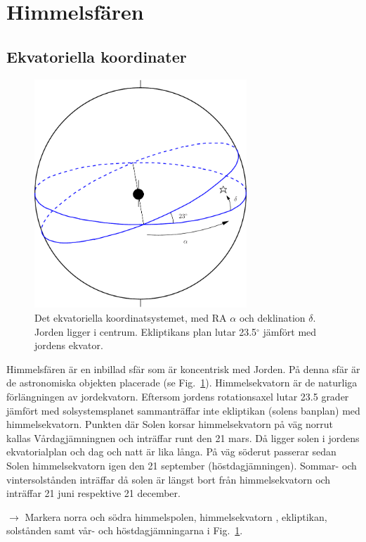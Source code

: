 \section{Himmelsfären}

\subsection{Ekvatoriella koordinater}

\begin{figure}[ht]
\begin{center}
\includegraphics[width=8cm]{../figures/celestial.pdf}
\end{center}
\caption{Det ekvatoriella koordinatsystemet, med RA $\alpha$ och
  deklination $\delta$. Jorden ligger i centrum. Ekliptikans plan
  lutar 23.5$^\circ$ jämfört med jordens ekvator.}
\label{figcelest}
\end{figure}

Himmelsfären är en inbillad sfär som är koncentrisk med Jorden. På
denna sfär är de astronomiska objekten placerade (se
Fig.~\ref{figcelest}). Himmelsekvatorn är de naturliga förlängningen
av jordekvatorn. Eftersom jordens rotationsaxel lutar 23.5 grader
jämfört med solsystemsplanet sammanträffar inte ekliptikan (solens
banplan) med himmelsekvatorn. Punkten där Solen korsar himmelsekvatorn
på väg norrut kallas Vårdagjämningnen och inträffar runt den 21
mars. Då ligger solen i jordens ekvatorialplan och dag och natt är
lika långa. På väg söderut passerar sedan Solen himmelsekvatorn igen
den 21 september (höstdagjämningen). Sommar- och vintersolstånden
inträffar då solen är längst bort från himmelsekvatorn och inträffar
21 juni respektive 21 december.

\medskip
{{$\rightarrow$ Markera norra och södra himmelspolen,
    himmelsekvatorn , ekliptikan, solstånden samt vår- och
    höstdagjämningarna i Fig.~\ref{figcelest}.}}
\medskip

